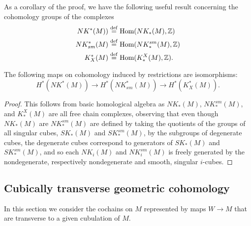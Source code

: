 As a corollary of the proof, we have the following useful result concerning the cohomology groups of the complexes
\begin{align*}
NK^*(M))& \stackrel{\mathrm{def}}{=} \textup{Hom}(NK_*(M),\mathbb{Z})\\
NK_{sm}^*(M)& \stackrel{\mathrm{def}}{=} \textup{Hom}(NK^{sm}_*(M),\mathbb{Z})\\
K^*_X(M)& \stackrel{\mathrm{def}}{=} \textup{Hom}(K^X_*(M),\mathbb{Z}).
\end{align*}



\begin{corollary}
The following maps on cohomology induced by restrictions are isomorphisms: $$H^*(NK^*(M)) \to H^*(NK_{sm}^*(M)) \to H^*(K^*_X(M)).$$
\end{corollary}
\begin{proof}
This follows from basic homological algebra \cite[Theorem 45.5]{Mun84} as $NK_*(M)$, $NK^{sm}_*(M)$, and $K^X_*(M)$ are all free chain complexes, observing that even though $NK_*(M)$ are $NK^{sm}_*(M)$ are defined by taking the quotients of the groups of all singular cubes, $SK_*(M)$ and $SK^{sm}_*(M)$, by the subgroups of degenerate cubes, the degenerate cubes correspond to generators of $SK_*(M)$ and $SK^{sm}_*(M)$, and so each $NK_i(M)$ and $NK^{sm}_i(M)$ is freely generated by the nondegenerate, respectively nondegenerate and smooth, singular $i$-cubes.
\end{proof}



\subsection{Cubically transverse geometric cohomology}\label{S: transverse cochains}


In this section we consider the cochains on $M$ represented by maps $W \to M$ that are transverse to a given cubulation of $M$.

